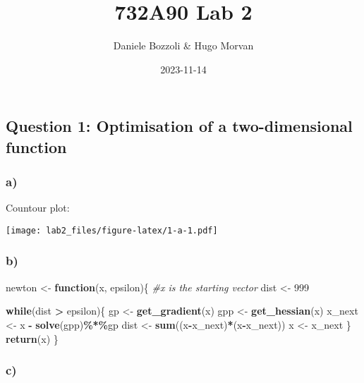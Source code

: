\documentclass[
]{article}
\title{732A90 Lab 2}
\author{Daniele Bozzoli \& Hugo Morvan}
\date{2023-11-14}
\newenvironment{Shaded}{\begin{snugshade}}{\end{snugshade}}
\newcommand{\CommentTok}[1]{\textcolor[rgb]{0.56,0.35,0.01}{\textit{#1}}}
\newcommand{\ControlFlowTok}[1]{\textcolor[rgb]{0.13,0.29,0.53}{\textbf{#1}}}
\newcommand{\DecValTok}[1]{\textcolor[rgb]{0.00,0.00,0.81}{#1}}
\newcommand{\FunctionTok}[1]{\textcolor[rgb]{0.13,0.29,0.53}{\textbf{#1}}}
\newcommand{\NormalTok}[1]{#1}
\newcommand{\OtherTok}[1]{\textcolor[rgb]{0.56,0.35,0.01}{#1}}
\newcommand{\SpecialCharTok}[1]{\textcolor[rgb]{0.81,0.36,0.00}{\textbf{#1}}}
\begin{document}
\maketitle

\hypertarget{question-1-optimisation-of-a-two-dimensional-function}{%
\subsection{Question 1: Optimisation of a two-dimensional
function}\label{question-1-optimisation-of-a-two-dimensional-function}}

\hypertarget{a}{%
\subsubsection{a)}\label{a}}

Countour plot:

\texttt{[image: lab2\_files/figure-latex/1-a-1.pdf]}

\hypertarget{b}{%
\subsubsection{b)}\label{b}}

\begin{Shaded}
\begin{Highlighting}[]
\NormalTok{newton }\OtherTok{\textless{}{-}} \ControlFlowTok{function}\NormalTok{(x, epsilon)\{}
  \CommentTok{\#x is the starting vector}
\NormalTok{  dist }\OtherTok{\textless{}{-}} \DecValTok{999}
  
  \ControlFlowTok{while}\NormalTok{(dist }\SpecialCharTok{\textgreater{}}\NormalTok{ epsilon)\{}
\NormalTok{    gp }\OtherTok{\textless{}{-}} \FunctionTok{get\_gradient}\NormalTok{(x)}
\NormalTok{    gpp }\OtherTok{\textless{}{-}} \FunctionTok{get\_hessian}\NormalTok{(x)}
\NormalTok{    x\_next }\OtherTok{\textless{}{-}}\NormalTok{ x }\SpecialCharTok{{-}} \FunctionTok{solve}\NormalTok{(gpp)}\SpecialCharTok{\%*\%}\NormalTok{gp}
\NormalTok{    dist }\OtherTok{\textless{}{-}} \FunctionTok{sum}\NormalTok{((x}\SpecialCharTok{{-}}\NormalTok{x\_next)}\SpecialCharTok{*}\NormalTok{(x}\SpecialCharTok{{-}}\NormalTok{x\_next))}
\NormalTok{    x }\OtherTok{\textless{}{-}}\NormalTok{ x\_next}
\NormalTok{  \}}
  \FunctionTok{return}\NormalTok{(x)}
\NormalTok{\}}
\end{Highlighting}
\end{Shaded}

\hypertarget{c}{%
\subsubsection{c)}\label{c}}
\end{document}
